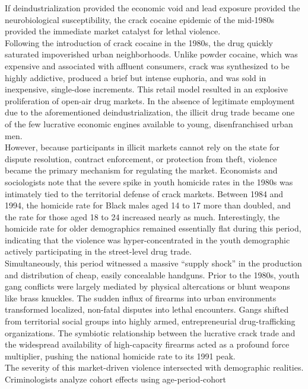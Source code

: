 \documentclass[
]{article}
\begin{document}
If deindustrialization provided the economic void and lead exposure
provided the neurobiological susceptibility, the crack cocaine epidemic
of the mid-1980s provided the immediate market catalyst for lethal
violence.\\
Following the introduction of crack cocaine in the 1980s, the drug
quickly saturated impoverished urban neighborhoods. Unlike powder
cocaine, which was expensive and associated with affluent consumers,
crack was synthesized to be highly addictive, produced a brief but
intense euphoria, and was sold in inexpensive, single-dose increments.
This retail model resulted in an explosive proliferation of open-air
drug markets. In the absence of legitimate employment due to the
aforementioned deindustrialization, the illicit drug trade became one of
the few lucrative economic engines available to young, disenfranchised
urban men.\\
However, because participants in illicit markets cannot rely on the
state for dispute resolution, contract enforcement, or protection from
theft, violence became the primary mechanism for regulating the market.
Economists and sociologists note that the severe spike in youth homicide
rates in the 1980s was intimately tied to the territorial defense of
crack markets. Between 1984 and 1994, the homicide rate for Black males
aged 14 to 17 more than doubled, and the rate for those aged 18 to 24
increased nearly as much. Interestingly, the homicide rate for older
demographics remained essentially flat during this period, indicating
that the violence was hyper-concentrated in the youth demographic
actively participating in the street-level drug trade.\\
Simultaneously, this period witnessed a massive ``supply shock'' in the
production and distribution of cheap, easily concealable handguns. Prior
to the 1980s, youth gang conflicts were largely mediated by physical
altercations or blunt weapons like brass knuckles. The sudden influx of
firearms into urban environments transformed localized, non-fatal
disputes into lethal encounters. Gangs shifted from territorial social
groups into highly armed, entrepreneurial drug-trafficking
organizations. The symbiotic relationship between the lucrative crack
trade and the widespread availability of high-capacity firearms acted as
a profound force multiplier, pushing the national homicide rate to its
1991 peak.\\
The severity of this market-driven violence intersected with demographic
realities. Criminologists analyze cohort effects using age-period-cohort
\end{document}
